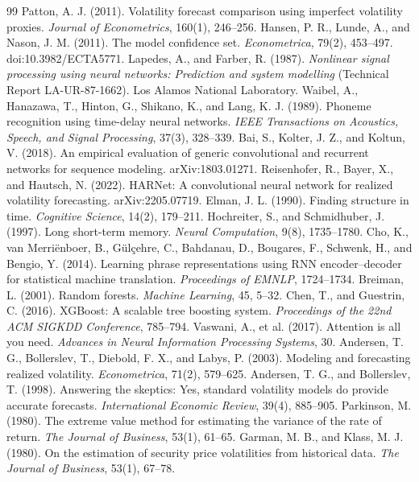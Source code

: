 \documentclass[12pt,a4paper]{article}
\numberwithin{equation}{section}
\numberwithin{table}{section}
\numberwithin{figure}{section}
\begin{document}
\begin{thebibliography}{99}
 Patton, A. J. (2011). Volatility forecast comparison using imperfect volatility proxies. \emph{Journal of Econometrics}, 160(1), 246--256.
 Hansen, P. R., Lunde, A., and Nason, J. M. (2011). The model confidence set. \emph{Econometrica}, 79(2), 453--497. doi:10.3982/ECTA5771.
 Lapedes, A., and Farber, R. (1987). \emph{Nonlinear signal processing using neural networks: Prediction and system modelling} (Technical Report LA-UR-87-1662). Los Alamos National Laboratory.
 Waibel, A., Hanazawa, T., Hinton, G., Shikano, K., and Lang, K. J. (1989). Phoneme recognition using time-delay neural networks. \emph{IEEE Transactions on Acoustics, Speech, and Signal Processing}, 37(3), 328--339.
 Bai, S., Kolter, J. Z., and Koltun, V. (2018). An empirical evaluation of generic convolutional and recurrent networks for sequence modeling. arXiv:1803.01271.
 Reisenhofer, R., Bayer, X., and Hautsch, N. (2022). HARNet: A convolutional neural network for realized volatility forecasting. arXiv:2205.07719.
 Elman, J. L. (1990). Finding structure in time. \emph{Cognitive Science}, 14(2), 179--211.
 Hochreiter, S., and Schmidhuber, J. (1997). Long short-term memory. \emph{Neural Computation}, 9(8), 1735--1780.
 Cho, K., van Merri\"enboer, B., G\"ul\c{c}ehre, C., Bahdanau, D., Bougares, F., Schwenk, H., and Bengio, Y. (2014). Learning phrase representations using RNN encoder--decoder for statistical machine translation. \emph{Proceedings of EMNLP}, 1724--1734.
 Breiman, L. (2001). Random forests. \emph{Machine Learning}, 45, 5--32.
 Chen, T., and Guestrin, C. (2016). XGBoost: A scalable tree boosting system. \emph{Proceedings of the 22nd ACM SIGKDD Conference}, 785--794.
 Vaswani, A., et al. (2017). Attention is all you need. \emph{Advances in Neural Information Processing Systems}, 30.
 Andersen, T. G., Bollerslev, T., Diebold, F. X., and Labys, P. (2003). Modeling and forecasting realized volatility. \emph{Econometrica}, 71(2), 579--625.
 Andersen, T. G., and Bollerslev, T. (1998). Answering the skeptics: Yes, standard volatility models do provide accurate forecasts. \emph{International Economic Review}, 39(4), 885--905.
 Parkinson, M. (1980). The extreme value method for estimating the variance of the rate of return. \emph{The Journal of Business}, 53(1), 61--65.
 Garman, M. B., and Klass, M. J. (1980). On the estimation of security price volatilities from historical data. \emph{The Journal of Business}, 53(1), 67--78.

\end{thebibliography}
\end{document}
